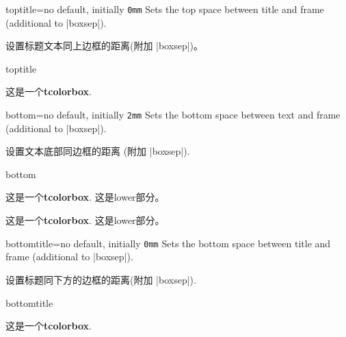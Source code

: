 \begin{docTcbKey}{toptitle}{=}{no default, initially \texttt{0mm}}
  Sets the top space between title and frame (additional to |boxsep|).

设置标题文本同上边框的距离(附加 |boxsep|)。    
\begin{exdispExample}{toptitle}

\begin{tcolorbox}[toptitle=3mm,title=My title]
这是一个\textbf{tcolorbox}.
\end{tcolorbox}
\end{exdispExample}
\end{docTcbKey}






\begin{docTcbKey}{bottom}{=}{no default, initially \texttt{2mm}}
  Sets the bottom space between text and frame (additional to |boxsep|).

设置文本底部同边框的距离 (附加 |boxsep|).
\begin{exdispExample}{bottom}

\begin{tcolorbox}[bottom=0mm]
这是一个\textbf{tcolorbox}.
\tcblower
这是lower部分。
\end{tcolorbox}
\begin{tcolorbox}
  这是一个\textbf{tcolorbox}.
  \tcblower
  这是lower部分。
  \end{tcolorbox}
\end{exdispExample}
\end{docTcbKey}

\begin{docTcbKey}{bottomtitle}{=}{no default, initially \texttt{0mm}}
  Sets the bottom space between title and frame (additional to |boxsep|).

设置标题同下方的边框的距离(附加 |boxsep|).
\begin{exdispExample}{bottomtitle}

\begin{tcolorbox}[bottomtitle=3mm,title=My title]
这是一个\textbf{tcolorbox}.
\end{tcolorbox}
\end{exdispExample}
\end{docTcbKey}


